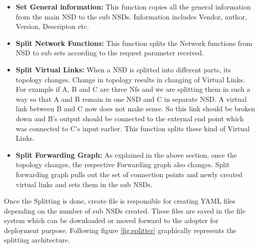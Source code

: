 \begin{itemize}
	\item \textbf{Set General information: }This function copies all the general information from the main NSD to the sub NSDs. Information includes Vendor, author, Version, Descripton etc.
	\item \textbf{Split Network Functions: }This function splits the Network functions from NSD to sub sets according to the request parameter received. 
	\item \textbf{Split Virtual Links: }When a NSD is splitted into different parts, its topology changes. Change in topology results in changing of Virtual Links. For example if A, B and C are three Nfs and we are splitting them in such a way so that A and B remain in one NSD and C in separate NSD. A virtual link between B and C now does not make sense. So this link should be broken down and B’s output should be connected to the external end point which was connected to C’s input earlier. This function splits these kind of Virtual Links.
	\item \textbf{Split Forwarding Graph: }As explained in the above section, once the topology changes, the respective Forwarding graph also changes. Split forwarding graph pulls out the set of connection points and newly created virtual links and sets them in the sub NSDs.
\end{itemize} 

Once the Splitting is done, create file is responsible for creating YAML files depending on the number of sub NSDs created. These files are saved in the file system which can be downloaded or moved forward to the adopter for deployment purpose. Following figure \ref{fig:splitter} graphically represents the splitting architecture.
